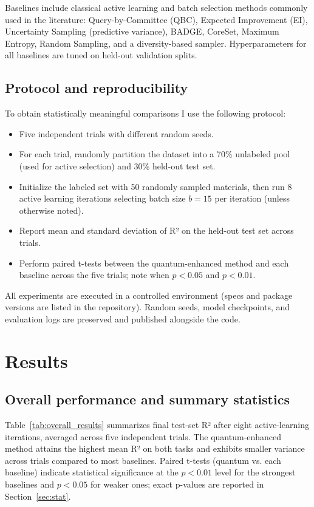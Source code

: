 \documentclass{article}
\begin{document}
Baselines include classical active learning and batch selection methods commonly used in the literature: Query-by-Committee (QBC), Expected Improvement (EI), Uncertainty Sampling (predictive variance), BADGE, CoreSet, Maximum Entropy, Random Sampling, and a diversity-based sampler. Hyperparameters for all baselines are tuned on held-out validation splits.

\subsection{Protocol and reproducibility}

To obtain statistically meaningful comparisons I use the following protocol:
\begin{itemize}
    \item Five independent trials with different random seeds.
    \item For each trial, randomly partition the dataset into a 70\% unlabeled pool (used for active selection) and 30\% held-out test set.
    \item Initialize the labeled set with 50 randomly sampled materials, then run 8 active learning iterations selecting batch size $b=15$ per iteration (unless otherwise noted).
    \item Report mean and standard deviation of R² on the held-out test set across trials.
    \item Perform paired t-tests between the quantum-enhanced method and each baseline across the five trials; note when $p<0.05$ and $p<0.01$.
\end{itemize}

All experiments are executed in a controlled environment (specs and package versions are listed in the repository). Random seeds, model checkpoints, and evaluation logs are preserved and published alongside the code.


\section{Results}
\label{sec:results}
\subsection{Overall performance and summary statistics}

Table~\ref{tab:overall_results} summarizes final test-set R² after eight active-learning iterations, averaged across five independent trials. The quantum-enhanced method attains the highest mean R² on both tasks and exhibits smaller variance across trials compared to most baselines. Paired t-tests (quantum vs.
each baseline) indicate statistical significance at the $p<0.01$ level for the strongest baselines and $p<0.05$ for weaker ones; exact p-values are reported in Section~\ref{sec:stat}.
\end{document}
